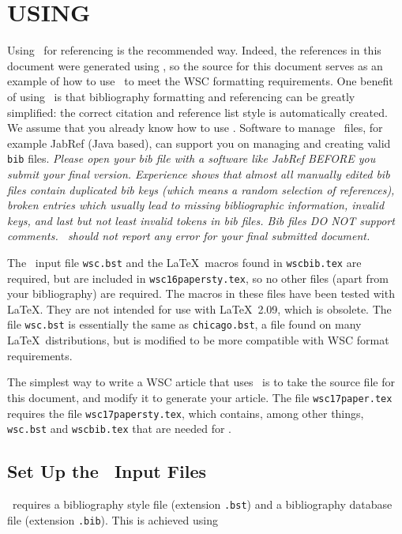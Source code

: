 \documentclass{wscpaperproc}
\theoremstyle{wsc}
\begin{document}
\section{USING \BibTeX}
\label{sec:bibtex}
Using \BibTeX\ for referencing is the recommended way. Indeed, the references in this document were generated using \BibTeX, so the source for this
document serves as an example of how to use \BibTeX\ to meet the WSC formatting requirements.
One benefit of using \BibTeX\ is that bibliography formatting and referencing can be greatly simplified: the correct citation and reference list style is automatically created.
We assume that you already know how to use \BibTeX.
Software to manage \BibTeX\ files, for example JabRef (Java based), can support you on managing and creating valid {\tt bib} files.
{\em Please open your bib file with a software like JabRef BEFORE you submit your final version. Experience shows that almost all manually edited bib files contain duplicated bib keys (which means a random selection of references), broken entries which usually lead to missing bibliographic information, invalid keys, and last but not least invalid tokens in bib files. Bib files DO NOT support comments. \BibTeX\ should not report any error for your final submitted document.}

The \BibTeX\ input file {\tt wsc.bst} and the \LaTeX\ macros found in {\tt wscbib.tex} are required, but are included in {\tt wsc16papersty.tex}, so no other files (apart from your bibliography) are required.
The macros in these files have been tested with \LaTeX. They are not intended for use with \LaTeX\ 2.09, which is obsolete.
The file {\tt wsc.bst} is essentially the same as {\tt chicago.bst}, a file found on many \LaTeX\ distributions, but is
modified to be more compatible with WSC format requirements.

The simplest way to write a WSC article that uses \BibTeX\ is to take the source file for this document, and modify it to generate your article. The file {\tt wsc17paper.tex} requires the file {\tt wsc17papersty.tex}, which contains, among other things, {\tt wsc.bst} and {\tt wscbib.tex} that are needed for \BibTeX.

\subsection{Set Up the \BibTeX\ Input Files}

\BibTeX\ requires a bibliography style file (extension \texttt{.bst}) and a bibliography database file (extension \texttt{.bib}).  This is achieved
using\newline
\end{document}
